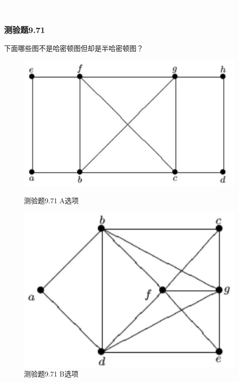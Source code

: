 \documentclass[UTF8, heading=true]{ctexart}
\begin{document}
\textcolor{white}{答案：ABC}

\subsubsection{测验题9.71}

下面哪些图不是哈密顿图但却是半哈密顿图？

\begin{figure}[H]
  \centering
  \begin{minipage}[t]{0.35\textwidth}
      \centering
      \includegraphics[width=1\textwidth]{9.67_1.jpg} %
      \vspace{-0.3cm}
      \caption{测验题9.71 A选项}
  \end{minipage}
  \hspace{0.1\textwidth} %
  \begin{minipage}[t]{0.35\textwidth}
      \centering
      \includegraphics[width=1\textwidth]{9.67_2.jpg} %
      \vspace{-0.3cm}
      \caption{测验题9.71 B选项}
\end{minipage}
\end{figure}
\end{document}

